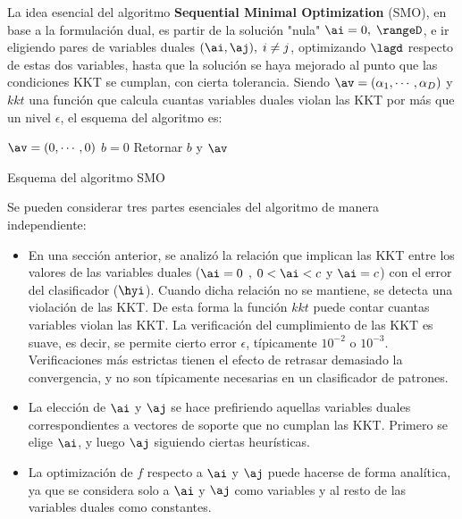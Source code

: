 La idea esencial del algoritmo \textbf{Sequential Minimal Optimization} (SMO), en base a la formulación dual, es partir de la solución "nula" $\ai = 0, \; \rangeD$, e ir eligiendo pares de variables duales $(\ai,\aj), \; i \neq j $, optimizando $\lagd$ respecto de estas dos variables, hasta que la solución se haya mejorado al punto que las condiciones KKT se cumplan, con cierta tolerancia. Siendo $\av = (\alpha_1,\cdots,\alpha_D)$ y $kkt$ una función que calcula cuantas variables duales violan las KKT por más que un nivel $\epsilon$, el esquema del algoritmo es:


\begin{algorithm}[H]
$\av=(0,\cdots,0)$\;
$b=0$\;
Retornar  $b$ y $\av$
\caption{Esquema del algoritmo SMO} 
\end{algorithm}
\vspace{10pt}

Se pueden considerar tres partes esenciales del algoritmo de manera independiente:

\begin{itemize}
\item En una sección anterior, se analizó la relación que implican las KKT entre los valores de las variables duales ($\ai =0$ , $0 <\ai < c$ y $\ai = c$) con el error del clasificador ($\hyi$). Cuando dicha relación no se mantiene, se detecta una violación de las KKT. De esta forma la función $kkt$ puede contar cuantas variables violan las KKT. La verificación del cumplimiento de las KKT es suave, es decir, se permite cierto error $\epsilon$, típicamente $10^{-2}$ o $10^{-3}$. Verificaciones más estrictas tienen el efecto de retrasar demasiado la convergencia, y no son típicamente necesarias en un clasificador de patrones. 

\item La elección de $\ai$ y $\aj$ se hace prefiriendo aquellas variables duales correspondientes a vectores de soporte que no cumplan las KKT. Primero se elige $\ai$, y luego $\aj$ siguiendo ciertas heurísticas.

\item La optimización de $f$ respecto a $\ai$ y $\aj$ puede hacerse de forma analítica, ya que se considera solo a $\ai$ y $\aj$ como variables y al resto de las variables duales como constantes.
\end{itemize}

